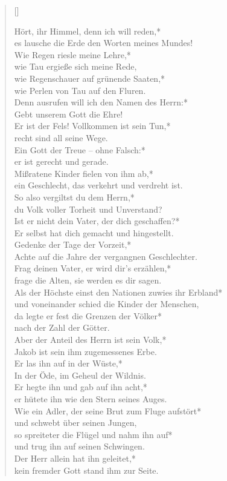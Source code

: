 \begin{verse}[\versewidth]
 
Hört, ihr Himmel, denn ich will reden,*\\
es lausche die Erde den Worten meines Mundes!\\
\vin Wie Regen riesle meine Lehre,*\\
\vin wie Tau ergieße sich meine Rede,\\
wie Regenschauer auf grünende Saaten,*\\
wie Perlen von Tau auf den Fluren.\\
\vin Denn ausrufen will ich den Namen des Herrn:*\\
\vin Gebt unserem Gott die Ehre!\\
Er ist der Fels! Vollkommen ist sein Tun,*\\
recht sind all seine Wege.\\
\vin Ein Gott der Treue – ohne Falsch:*\\
\vin er ist gerecht und gerade.\\
Mißratene Kinder fielen von ihm ab,*\\
ein Geschlecht, das verkehrt und verdreht ist.\\
\vin So also vergiltst du dem Herrn,*\\
\vin du Volk voller Torheit und Unverstand?\\
Ist er nicht dein Vater, der dich geschaffen?*\\
Er selbst hat dich gemacht und hingestellt. \\

Gedenke der Tage der Vorzeit,*\\
Achte auf die Jahre der vergangnen Geschlechter.\\
\vin Frag deinen Vater, er wird dir's erzählen,*\\
\vin frage die Alten, sie werden es dir sagen. \\
Als der Höchste einst den Nationen zuwies ihr Erbland*\\
und voneinander schied die Kinder der Menschen,\\
\vin da legte er fest die Grenzen der Völker*\\
\vin nach der Zahl der Götter.\\
Aber der Anteil des Herrn ist sein Volk,*\\
Jakob ist sein ihm zugemessenes Erbe.\\
\vin Er las ihn auf in der Wüste,*\\
\vin In der Öde, im Geheul der Wildnis.\\
Er hegte ihn und gab auf ihn acht,*\\
er hütete ihn wie den Stern seines Auges.\\
\vin Wie ein Adler, der seine Brut zum Fluge aufstört*\\
\vin und schwebt über seinen Jungen,\\
so spreiteter die Flügel und nahm ihn auf*\\
und trug ihn auf seinen Schwingen.\\
\vin Der Herr allein hat ihn geleitet,*\\
\vin kein fremder Gott stand ihm zur Seite.\\


\end{verse}
